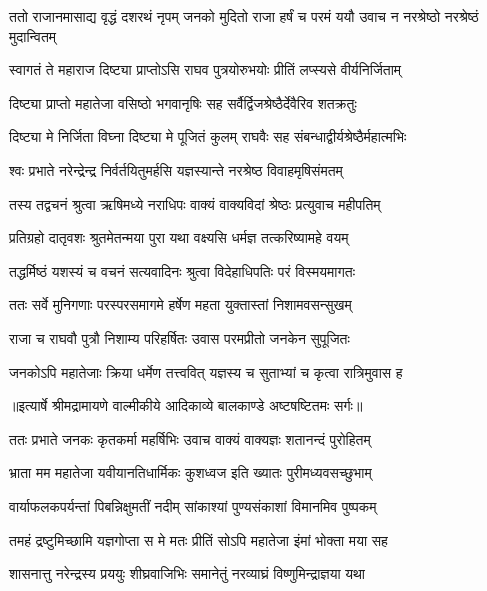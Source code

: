 \threelineshloka
{ततो राजानमासाद्य वृद्धं दशरथं नृपम्}
{जनको मुदितो राजा हर्षं च परमं ययौ}
{उवाच न नरश्रेष्ठो नरश्रेष्ठं मुदान्वितम्} %

\twolineshloka
{स्वागतं ते महाराज दिष्ट्या प्राप्तोऽसि राघव}
{पुत्रयोरुभयोः प्रीतिं लप्स्यसे वीर्यनिर्जिताम्} %

\twolineshloka
{दिष्ट्या प्राप्तो महातेजा वसिष्ठो भगवानृषिः}
{सह सर्वैर्द्विजश्रेष्ठैर्देवैरिव शतक्रतुः} %

\twolineshloka
{दिष्ट्या मे निर्जिता विघ्ना दिष्ट्या मे पूजितं कुलम्}
{राघवैः सह संबन्धाद्वीर्यश्रेष्ठैर्महात्मभिः} %

\twolineshloka
{श्वः प्रभाते नरेन्द्रेन्द्र निर्वर्तयितुमर्हसि}
{यज्ञस्यान्ते नरश्रेष्ठ विवाहमृषिसंमतम्} %

\twolineshloka
{तस्य तद्वचनं श्रुत्वा ऋषिमध्ये नराधिपः}
{वाक्यं वाक्यविदां श्रेष्ठः प्रत्युवाच महीपतिम्} %

\twolineshloka
{प्रतिग्रहो दातृवशः श्रुतमेतन्मया पुरा}
{यथा वक्ष्यसि धर्मज्ञ तत्करिष्यामहे वयम्} %

\twolineshloka
{तद्धर्मिष्ठं यशस्यं च वचनं सत्यवादिनः}
{श्रुत्वा विदेहाधिपतिः परं विस्मयमागतः} %

\twolineshloka
{ततः सर्वे मुनिगणाः परस्परसमागमे}
{हर्षेण महता युक्तास्तां निशामवसन्सुखम्} %

\twolineshloka
{राजा च राघवौ पुत्रौ निशाम्य परिहर्षितः}
{उवास परमप्रीतो जनकेन सुपूजितः} %

\twolineshloka
{जनकोऽपि महातेजाः क्रिया धर्मेण तत्त्ववित्}
{यज्ञस्य च सुताभ्यां च कृत्वा रात्रिमुवास ह} %


{॥इत्यार्षे श्रीमद्रामायणे वाल्मीकीये आदिकाव्ये बालकाण्डे अष्टषष्टितमः सर्गः॥}


\twolineshloka
{ततः प्रभाते जनकः कृतकर्मा महर्षिभिः}
{उवाच वाक्यं वाक्यज्ञः शतानन्दं पुरोहितम्} %

\twolineshloka
{भ्राता मम महातेजा यवीयानतिधार्मिकः}
{कुशध्वज इति ख्यातः पुरीमध्यवसच्छुभाम्} %

\twolineshloka
{वार्याफलकपर्यन्तां पिबन्निक्षुमतीं नदीम्}
{सांकाश्यां पुण्यसंकाशां विमानमिव पुष्पकम्} %

\twolineshloka
{तमहं द्रष्टुमिच्छामि यज्ञगोप्ता स मे मतः}
{प्रीतिं सोऽपि महातेजा इंमां भोक्ता मया सह} %

\twolineshloka
{शासनात्तु नरेन्द्रस्य प्रययुः शीघ्रवाजिभिः}
{समानेतुं नरव्याघ्रं विष्णुमिन्द्राज्ञया यथा} %

